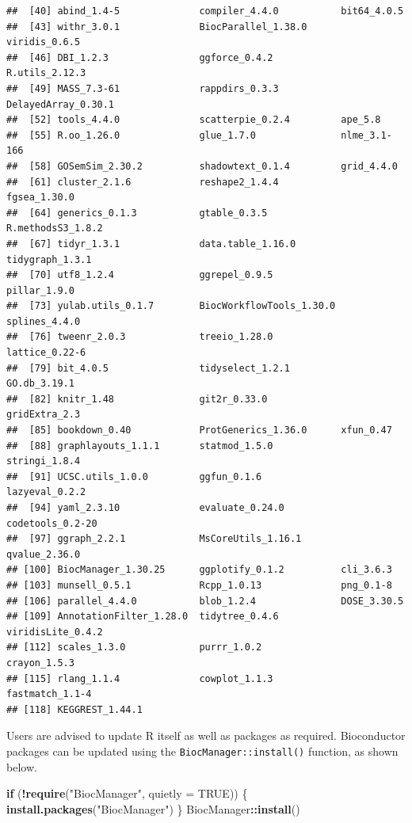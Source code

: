 \documentclass[9pt,a4paper,]{extarticle}
\newenvironment{Shaded}{\begin{snugshade}}{\end{snugshade}}
\newcommand{\AttributeTok}[1]{\textcolor[rgb]{0.13,0.29,0.53}{#1}}
\newcommand{\ConstantTok}[1]{\textcolor[rgb]{0.56,0.35,0.01}{#1}}
\newcommand{\ControlFlowTok}[1]{\textcolor[rgb]{0.13,0.29,0.53}{\textbf{#1}}}
\newcommand{\FunctionTok}[1]{\textcolor[rgb]{0.13,0.29,0.53}{\textbf{#1}}}
\newcommand{\NormalTok}[1]{#1}
\newcommand{\SpecialCharTok}[1]{\textcolor[rgb]{0.81,0.36,0.00}{\textbf{#1}}}
\newcommand{\StringTok}[1]{\textcolor[rgb]{0.31,0.60,0.02}{#1}}
\begin{document}
\begin{verbatim}
##  [40] abind_1.4-5              compiler_4.4.0           bit64_4.0.5             
##  [43] withr_3.0.1              BiocParallel_1.38.0      viridis_0.6.5           
##  [46] DBI_1.2.3                ggforce_0.4.2            R.utils_2.12.3          
##  [49] MASS_7.3-61              rappdirs_0.3.3           DelayedArray_0.30.1     
##  [52] tools_4.4.0              scatterpie_0.2.4         ape_5.8                 
##  [55] R.oo_1.26.0              glue_1.7.0               nlme_3.1-166            
##  [58] GOSemSim_2.30.2          shadowtext_0.1.4         grid_4.4.0              
##  [61] cluster_2.1.6            reshape2_1.4.4           fgsea_1.30.0            
##  [64] generics_0.1.3           gtable_0.3.5             R.methodsS3_1.8.2       
##  [67] tidyr_1.3.1              data.table_1.16.0        tidygraph_1.3.1         
##  [70] utf8_1.2.4               ggrepel_0.9.5            pillar_1.9.0            
##  [73] yulab.utils_0.1.7        BiocWorkflowTools_1.30.0 splines_4.4.0           
##  [76] tweenr_2.0.3             treeio_1.28.0            lattice_0.22-6          
##  [79] bit_4.0.5                tidyselect_1.2.1         GO.db_3.19.1            
##  [82] knitr_1.48               git2r_0.33.0             gridExtra_2.3           
##  [85] bookdown_0.40            ProtGenerics_1.36.0      xfun_0.47               
##  [88] graphlayouts_1.1.1       statmod_1.5.0            stringi_1.8.4           
##  [91] UCSC.utils_1.0.0         ggfun_0.1.6              lazyeval_0.2.2          
##  [94] yaml_2.3.10              evaluate_0.24.0          codetools_0.2-20        
##  [97] ggraph_2.2.1             MsCoreUtils_1.16.1       qvalue_2.36.0           
## [100] BiocManager_1.30.25      ggplotify_0.1.2          cli_3.6.3               
## [103] munsell_0.5.1            Rcpp_1.0.13              png_0.1-8               
## [106] parallel_4.4.0           blob_1.2.4               DOSE_3.30.5             
## [109] AnnotationFilter_1.28.0  tidytree_0.4.6           viridisLite_0.4.2       
## [112] scales_1.3.0             purrr_1.0.2              crayon_1.5.3            
## [115] rlang_1.1.4              cowplot_1.1.3            fastmatch_1.1-4         
## [118] KEGGREST_1.44.1
\end{verbatim}

Users are advised to update R itself as well as packages as required.
Bioconductor packages can be updated using the \texttt{BiocManager::install()}
function, as shown below.

\begin{Shaded}
\begin{Highlighting}[]
\ControlFlowTok{if}\NormalTok{ (}\SpecialCharTok{!}\FunctionTok{require}\NormalTok{(}\StringTok{"BiocManager"}\NormalTok{, }\AttributeTok{quietly =} \ConstantTok{TRUE}\NormalTok{)) \{}
  \FunctionTok{install.packages}\NormalTok{(}\StringTok{"BiocManager"}\NormalTok{)}
\NormalTok{\}}
\NormalTok{BiocManager}\SpecialCharTok{::}\FunctionTok{install}\NormalTok{()}
\end{Highlighting}
\end{Shaded}
\end{document}
